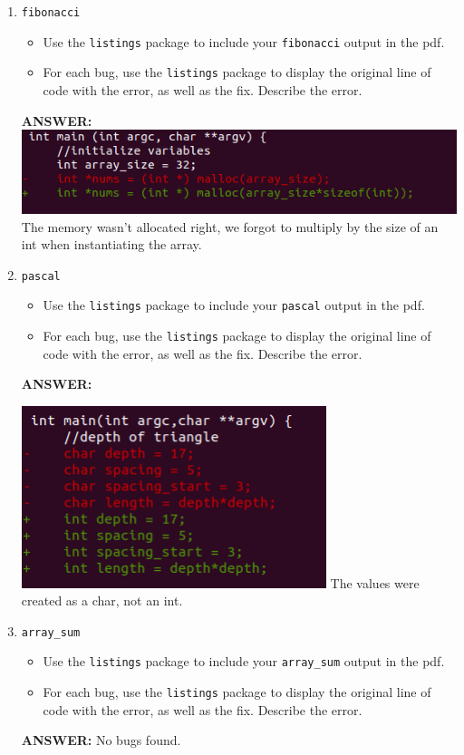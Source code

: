 \begin{enumerate}
    \item \texttt{fibonacci}
    \begin{itemize}
        \item Use the \texttt{listings} package to include your \texttt{fibonacci} output in the pdf.
        \item For each bug, use the \texttt{listings} package to display the original line of code with the error, as well as the fix.  Describe the error.
    \end{itemize}
    \textbf{ANSWER:} 
    \includegraphics[width=\textwidth]{Bug5.png}
    The memory wasn't allocated right, we forgot to multiply by the size of an int when instantiating the array.

    \item \texttt{pascal}
    \begin{itemize}
        \item Use the \texttt{listings} package to include your \texttt{pascal} output in the pdf.
        \item For each bug, use the \texttt{listings} package to display the original line of code with the error, as well as the fix.  Describe the error.
    \end{itemize}
    \textbf{ANSWER:}
    
    \includegraphics[width=0.7\textwidth]{Bug6.png} \newline
    The values were created as a char, not an int.

    \item \texttt{array\_sum}
    \begin{itemize}
        \item Use the \texttt{listings} package to include your \texttt{array\_sum} output in the pdf.
        \item For each bug, use the \texttt{listings} package to display the original line of code with the error, as well as the fix.  Describe the error.
    \end{itemize}
    \textbf{ANSWER:} 
    No bugs found.


\end{enumerate}
